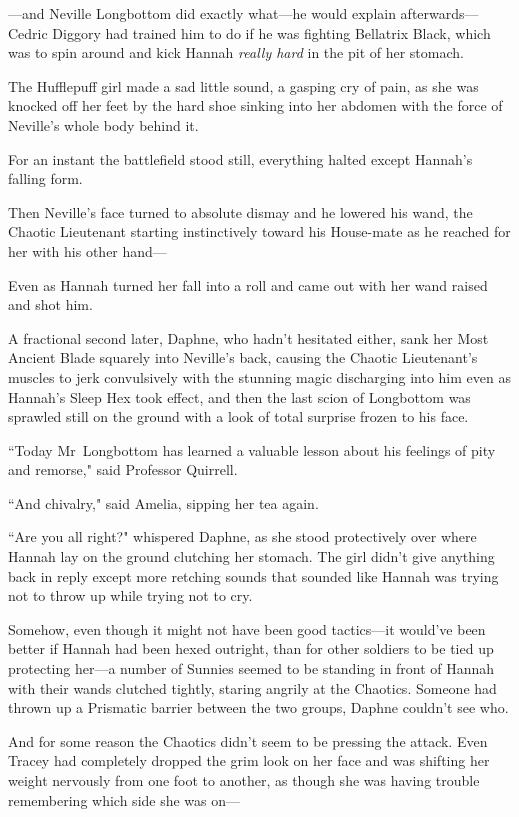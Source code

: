 —and Neville Longbottom did exactly what—he would explain afterwards—Cedric Diggory had trained him to do if he was fighting Bellatrix Black, which was to spin around and kick Hannah \emph{really hard} in the pit of her stomach.

The Hufflepuff girl made a sad little sound, a gasping cry of pain, as she was knocked off her feet by the hard shoe sinking into her abdomen with the force of Neville's whole body behind it.

For an instant the battlefield stood still, everything halted except Hannah's falling form.

Then Neville's face turned to absolute dismay and he lowered his wand, the Chaotic Lieutenant starting instinctively toward his House-mate as he reached for her with his other hand—

Even as Hannah turned her fall into a roll and came out with her wand raised and shot him.

A fractional second later, Daphne, who hadn't hesitated either, sank her Most Ancient Blade squarely into Neville's back, causing the Chaotic Lieutenant's muscles to jerk convulsively with the stunning magic discharging into him even as Hannah's Sleep Hex took effect, and then the last scion of Longbottom was sprawled still on the ground with a look of total surprise frozen to his face.

\later

``Today Mr~Longbottom has learned a valuable lesson about his feelings of pity and remorse," said Professor Quirrell.

``And chivalry," said Amelia, sipping her tea again.

\later

``Are you all right?" whispered Daphne, as she stood protectively over where Hannah lay on the ground clutching her stomach. The girl didn't give anything back in reply except more retching sounds that sounded like Hannah was trying not to throw up while trying not to cry.

Somehow, even though it might not have been good tactics—it would've been better if Hannah had been hexed outright, than for other soldiers to be tied up protecting her—a number of Sunnies seemed to be standing in front of Hannah with their wands clutched tightly, staring angrily at the Chaotics. Someone had thrown up a Prismatic barrier between the two groups, Daphne couldn't see who.

And for some reason the Chaotics didn't seem to be pressing the attack. Even Tracey had completely dropped the grim look on her face and was shifting her weight nervously from one foot to another, as though she was having trouble remembering which side she was on—

